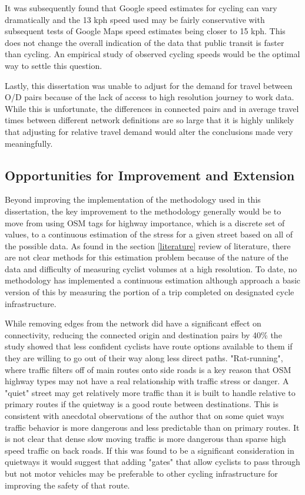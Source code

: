 It was subsequently found that Google speed estimates for cycling can vary dramatically and the 13 kph speed used may be fairly conservative with subsequent tests of Google Maps speed estimates being closer to 15 kph. This does not change the overall indication of the data that public transit is faster than cycling. An empirical study of observed cycling speeds would be the optimal way to settle this question. 

Lastly, this dissertation was unable to adjust for the demand for travel between O/D pairs because of the lack of access to high resolution journey to work data. While this is unfortunate, the differences in connected pairs and in average travel times between different network definitions are so large that it is highly unlikely that adjusting for relative travel demand would alter the conclusions made very meaningfully. 

\subsection{Opportunities for Improvement and Extension}

Beyond improving the implementation of the methodology used in this dissertation, the key improvement to the methodology generally would be to move from using OSM tags for highway importance, which is a discrete set of values, to a continuous estimation of the stress for a given street based on all of the possible data. As found in the section \ref{literature} review of literature, there are not clear methods for this estimation problem because of the nature of the data and difficulty of measuring cyclist volumes at a high resolution. To date, no methodology has implemented a continuous estimation although \textcite{boisjoly2019bicycle} approach a basic version of this by measuring the portion of a trip completed on designated cycle infrastructure. 

While removing edges from the network did have a significant effect on connectivity, reducing the connected origin and destination pairs by 40\% the study showed that less confident cyclists have route options available to them if they are willing to go out of their way along less direct paths. "Rat-running", where traffic filters off of main routes onto side roads is a key reason that OSM highway types may not have a real relationship with traffic stress or danger. A "quiet" street may get relatively more traffic than it is built to handle relative to primary routes if the quietway is a good route between destinations. This is consistent with anecdotal observations of the author that on some quiet ways traffic behavior is more dangerous and less predictable than on primary routes. It is not clear that dense slow moving traffic is more dangerous than sparse high speed traffic on back roads. If this was found to be a significant consideration in quietways it would suggest that adding "gates" that allow cyclists to pass through  but not motor vehicles may be preferable to other cycling infrastructure for improving the safety of that route.

